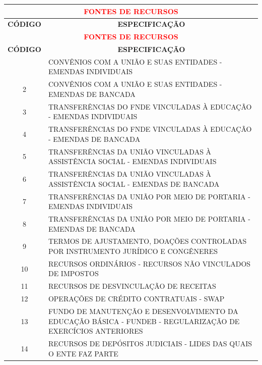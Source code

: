 \documentclass{article}
\begin{document}
\noindent\begin{longtable}[c]{m{1cm}|m{11cm}}
\multicolumn{2}{c}{\cellcolor{gray!50} \textcolor{red} {\normalsize \textbf{FONTES DE RECURSOS}}}\Tstrut  \\[2ex]
\hline\hline
\multicolumn{1}{c|}{\textbf{CÓDIGO}} & \multicolumn{1}{c}{\textbf{ESPECIFICAÇÃO}} \\
\hline
\endfirsthead
\multicolumn{2}{c}{\cellcolor{gray!50} \textcolor{red} {\normalsize \textbf{FONTES DE RECURSOS}}}\Tstrut  \\[2ex]
\hline\hline
\multicolumn{1}{c|}{\textbf{CÓDIGO}} & \multicolumn{1}{c}{\textbf{ESPECIFICAÇÃO}} \\
\hline
\endhead
\endfoot
\hline\hline\hline
\endlastfoot
\multicolumn{1}{c|}{ 1 } & CONVÊNIOS COM A UNIÃO E SUAS ENTIDADES - EMENDAS INDIVIDUAIS \\
\multicolumn{1}{c|}{ 2 } & CONVÊNIOS COM A UNIÃO E SUAS ENTIDADES - EMENDAS DE BANCADA \\
\multicolumn{1}{c|}{ 3 } & TRANSFERÊNCIAS DO FNDE VINCULADAS À EDUCAÇÃO - EMENDAS INDIVIDUAIS \\
\multicolumn{1}{c|}{ 4 } & TRANSFERÊNCIAS DO FNDE VINCULADAS À EDUCAÇÃO - EMENDAS DE BANCADA \\
\multicolumn{1}{c|}{ 5 } & TRANSFERÊNCIAS DA UNIÃO VINCULADAS À ASSISTÊNCIA SOCIAL - EMENDAS INDIVIDUAIS \\
\multicolumn{1}{c|}{ 6 } & TRANSFERÊNCIAS DA UNIÃO VINCULADAS À ASSISTÊNCIA SOCIAL - EMENDAS DE BANCADA \\
\multicolumn{1}{c|}{ 7 } & TRANSFERÊNCIAS DA UNIÃO POR MEIO DE PORTARIA - EMENDAS INDIVIDUAIS \\
\multicolumn{1}{c|}{ 8 } & TRANSFERÊNCIAS DA UNIÃO POR MEIO DE PORTARIA - EMENDAS DE BANCADA \\
\multicolumn{1}{c|}{ 9 } & TERMOS DE AJUSTAMENTO, DOAÇÕES CONTROLADAS POR INSTRUMENTO JURÍDICO E CONGÊNERES \\
\multicolumn{1}{c|}{ 10 } & RECURSOS ORDINÁRIOS - RECURSOS NÃO VINCULADOS DE IMPOSTOS \\
\multicolumn{1}{c|}{ 11 } & RECURSOS DE DESVINCULAÇÃO DE RECEITAS \\
\multicolumn{1}{c|}{ 12 } & OPERAÇÕES DE CRÉDITO CONTRATUAIS - SWAP \\
\multicolumn{1}{c|}{ 13 } & FUNDO DE MANUTENÇÃO E DESENVOLVIMENTO DA EDUCAÇÃO BÁSICA - FUNDEB - REGULARIZAÇÃO DE EXERCÍCIOS ANTERIORES \\
\multicolumn{1}{c|}{ 14 } & RECURSOS DE DEPÓSITOS JUDICIAIS - LIDES DAS QUAIS O ENTE FAZ PARTE \\

\end{longtable}
\end{document}

